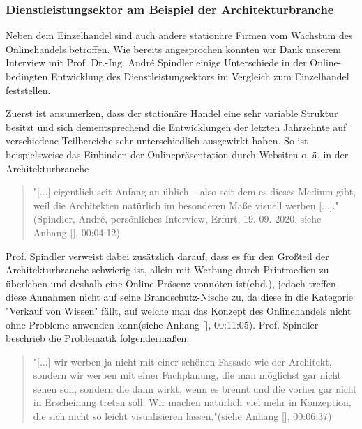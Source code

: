 \begin{folding}

\end{folding}

\begin{folding} \subsubsection{Dienstleistungsektor am Beispiel der Architekturbranche}

Neben dem Einzelhandel sind auch andere stationäre Firmen vom Wachstum des Onlinehandels betroffen. Wie bereits angesprochen konnten wir Dank unserem Interview mit Prof. Dr.-Ing. André Spindler einige Unterschiede in der Online-bedingten Entwicklung des Dienstleistungsektors im Vergleich zum Einzelhandel feststellen.

Zuerst ist anzumerken, dass der stationäre Handel eine sehr variable Struktur besitzt und sich dementsprechend die Entwicklungen der letzten Jahrzehnte auf verschiedene Teilbereiche sehr unterschiedlich ausgewirkt haben. So ist beispielsweise das Einbinden der Onlinepräsentation durch Websiten o. ä. in der Architekturbranche

\begin{quote}
"[...] eigentlich seit Anfang an üblich – also seit dem es dieses Medium gibt, weil die Architekten natürlich im besonderen Maße visuell werben [...]."(Spindler, André, persönliches Interview, Erfurt, 19. 09. 2020, siehe Anhang [], 00:04:12)
\end{quote} 
Prof. Spindler verweist dabei zusätzlich darauf, dass es für den Großteil der Architekturbranche schwierig ist, allein mit Werbung durch Printmedien zu überleben und deshalb eine Online-Präsenz vonnöten ist(ebd.), jedoch treffen diese Annahmen nicht auf seine Brandschutz-Nische zu, da diese in die Kategorie "Verkauf von Wissen" fällt, auf welche man das Konzept des Onlinehandels nicht ohne Probleme anwenden kann(siehe Anhang [], 00:11:05). Prof. Spindler beschrieb die Problematik folgendermaßen:

\begin{quote}
"[...] wir werben ja nicht mit einer schönen Fassade wie der Architekt, sondern wir werben mit einer Fachplanung, die man möglichst gar nicht sehen soll, sondern die dann wirkt, wenn es brennt und die vorher gar nicht in Erscheinung treten soll. Wir machen natürlich viel mehr in Konzeption, die sich nicht so leicht visualisieren lassen."(siehe Anhang [], 00:06:37)
\end{quote} 


\end{folding}
